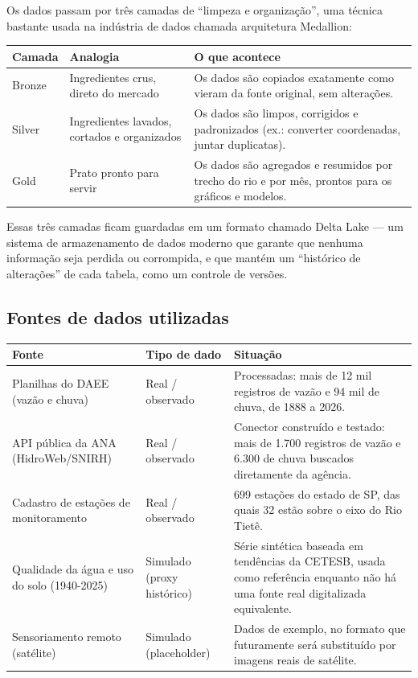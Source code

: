 \documentclass[11pt,a4paper]{article}
\begin{document}
Os dados passam por três camadas de ``limpeza e organização'', uma técnica bastante usada na indústria de dados chamada arquitetura Medallion:

\begin{center}
\begin{longtable}{p{2.8cm}p{4.2cm}p{7.5cm}}
\toprule
\textbf{Camada} & \textbf{Analogia} & \textbf{O que acontece} \\
\midrule
\endhead
Bronze & Ingredientes crus, direto do mercado & Os dados são copiados exatamente como vieram da fonte original, sem alterações. \\
Silver & Ingredientes lavados, cortados e organizados & Os dados são limpos, corrigidos e padronizados (ex.: converter coordenadas, juntar duplicatas). \\
Gold & Prato pronto para servir & Os dados são agregados e resumidos por trecho do rio e por mês, prontos para os gráficos e modelos. \\
\bottomrule
\end{longtable}
\end{center}

Essas três camadas ficam guardadas em um formato chamado Delta Lake — um sistema de armazenamento de dados moderno que garante que nenhuma informação seja perdida ou corrompida, e que mantém um ``histórico de alterações'' de cada tabela, como um controle de versões.

\subsection{Fontes de dados utilizadas}

\begin{center}
\begin{longtable}{p{2.8cm}p{4.2cm}p{7.5cm}}
\toprule
\textbf{Fonte} & \textbf{Tipo de dado} & \textbf{Situação} \\
\midrule
\endhead
Planilhas do DAEE (vazão e chuva) & Real / observado & Processadas: mais de 12 mil registros de vazão e 94 mil de chuva, de 1888 a 2026. \\
API pública da ANA (HidroWeb/SNIRH) & Real / observado & Conector construído e testado: mais de 1.700 registros de vazão e 6.300 de chuva buscados diretamente da agência. \\
Cadastro de estações de monitoramento & Real / observado & 699 estações do estado de SP, das quais 32 estão sobre o eixo do Rio Tietê. \\
Qualidade da água e uso do solo (1940-2025) & Simulado (proxy histórico) & Série sintética baseada em tendências da CETESB, usada como referência enquanto não há uma fonte real digitalizada equivalente. \\
Sensoriamento remoto (satélite) & Simulado (placeholder) & Dados de exemplo, no formato que futuramente será substituído por imagens reais de satélite. \\
\bottomrule
\end{longtable}
\end{center}
\end{document}
